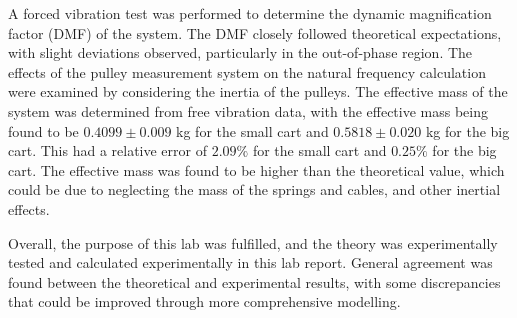 A forced vibration test was performed to determine the dynamic magnification factor (DMF) of the system. The DMF closely followed theoretical expectations, with slight deviations observed, particularly in the out-of-phase region. The effects of the pulley measurement system on the natural frequency calculation were examined by considering the inertia of the pulleys. The effective mass of the system was determined from free vibration data, with the effective mass being found to be $0.4099 \pm 0.009$ kg for the small cart and $0.5818 \pm 0.020$ kg for the big cart. This had a relative error of $2.09\%$ for the small cart and $0.25\%$ for the big cart. The effective mass was found to be higher than the theoretical value, which could be due to neglecting the mass of the springs and cables, and other inertial effects.

Overall, the purpose of this lab was fulfilled, and the theory was experimentally tested and calculated experimentally in this lab report. General agreement was found between the theoretical and experimental results, with some discrepancies that could be improved through more comprehensive modelling.


